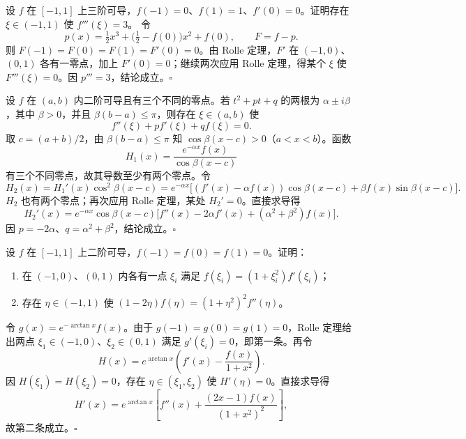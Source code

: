 设 $f$ 在 $[-1,1]$ 上三阶可导，$f(-1)=0$、$f(1)=1$、$f'(0)=0$。证明存在 $\xi\in(-1,1)$ 使 $f'''(\xi)=3$。
\pf 令
\[
p(x)=\tfrac12x^3+\bigl(\tfrac12-f(0)\bigr)x^2+f(0),\qquad F=f-p.
\]
则 $F(-1)=F(0)=F(1)=F'(0)=0$。由 Rolle 定理，$F'$ 在 $(-1,0)$、$(0,1)$ 各有一零点，加上 $F'(0)=0$；继续两次应用 Rolle 定理，得某个 $\xi$ 使 $F'''(\xi)=0$。因 $p'''=3$，结论成立。\hfill$\square$

设 $f$ 在 $(a,b)$ 内二阶可导且有三个不同的零点。若 $t^2+pt+q$ 的两根为 $\alpha\pm i\beta$，其中 $\beta>0$，并且 $\beta(b-a)\leq\pi$，则存在 $\xi\in(a,b)$ 使
\[
f''(\xi)+pf'(\xi)+qf(\xi)=0.
\]
\pf 取 $c=(a+b)/2$，由 $\beta(b-a)\leq\pi$ 知 $\cos\beta(x-c)>0$（$a<x<b$）。函数
\[
H_1(x)=\frac{e^{-\alpha x}f(x)}{\cos\beta(x-c)}
\]
有三个不同零点，故其导数至少有两个零点。令
\[
H_2(x)=H_1'(x)\cos^2\beta(x-c)
=e^{-\alpha x}\bigl[(f'(x)-\alpha f(x))\cos\beta(x-c)+\beta f(x)\sin\beta(x-c)\bigr].
\]
$H_2$ 也有两个零点；再次应用 Rolle 定理，某处 $H_2'=0$。直接求导得
\[
H_2'(x)=e^{-\alpha x}\cos\beta(x-c)
\bigl[f''(x)-2\alpha f'(x)+(\alpha^2+\beta^2)f(x)\bigr].
\]
因 $p=-2\alpha$、$q=\alpha^2+\beta^2$，结论成立。\hfill$\square$

设 $f$ 在 $[-1,1]$ 上二阶可导，$f(-1)=f(0)=f(1)=0$。证明：
\begin{enumerate}[label=（\roman*）,leftmargin=3em]
\item 在 $(-1,0)$、$(0,1)$ 内各有一点 $\xi_i$ 满足 $f(\xi_i)=(1+\xi_i^2)f'(\xi_i)$；
\item 存在 $\eta\in(-1,1)$ 使 $(1-2\eta)f(\eta)=(1+\eta^2)^2f''(\eta)$。
\end{enumerate}
\pf 令 $g(x)=e^{-\arctan x}f(x)$。由于 $g(-1)=g(0)=g(1)=0$，Rolle 定理给出两点 $\xi_1\in(-1,0)$、$\xi_2\in(0,1)$ 满足 $g'(\xi_i)=0$，即第一条。再令
\[
H(x)=e^{\arctan x}\left(f'(x)-\frac{f(x)}{1+x^2}\right).
\]
因 $H(\xi_1)=H(\xi_2)=0$，存在 $\eta\in(\xi_1,\xi_2)$ 使 $H'(\eta)=0$。直接求导得
\[
H'(x)=e^{\arctan x}\left[f''(x)+\frac{(2x-1)f(x)}{(1+x^2)^2}\right],
\]
故第二条成立。\hfill$\square$
